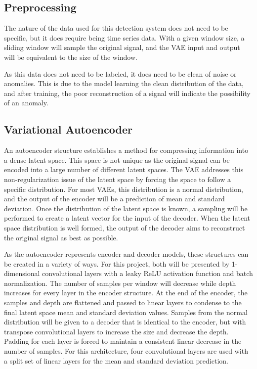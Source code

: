 \documentclass[conference]{IEEEtran}
\begin{document}
\subsection{Preprocessing}
The nature of the data used for this detection system does not need to be specific, but it does require being time series data. With a given window size, a sliding window will sample the original signal, and the VAE input and output will be equivalent to the size of the window. 

As this data does not need to be labeled, it does need to be clean of noise or anomalies. This is due to the model learning the clean distribution of the data, and after training, the poor reconstruction of a signal will indicate the possibility of an anomaly.


\subsection{Variational Autoencoder}
An autoencoder structure establishes a method for compressing information into a dense latent space. This space is not unique as the original signal can be encoded into a large number of different latent spaces. The VAE addresses this non-regularization issue of the latent space by forcing the space to follow a specific distribution\cite{vae_page}. For most VAEs, this distribution is a normal distribution, and the output of the encoder will be a prediction of mean and standard deviation. Once the distribution of the latent space is known, a sampling will be performed to create a latent vector for the input of the decoder. When the latent space distribution is well formed, the output of the decoder aims to reconstruct the original signal as best as possible.

As the autoencoder represents encoder and decoder models, these structures can be created in a variety of ways. For this project, both will be presented by 1-dimensional convolutional layers with a leaky ReLU activation function and batch normalization. The number of samples per window will decrease while depth increases for every layer in the encoder structure. At the end of the encoder, the samples and depth are flattened and passed to linear layers to condense to the final latent space mean and standard deviation values. Samples from the normal distribution will be given to a decoder that is identical to the encoder, but with transpose convolutional layers to increase the size and decrease the depth. Padding for each layer is forced to maintain a consistent  linear decrease in the number of samples. For this architecture, four convolutional layers are used with a split set of linear layers for the mean and standard deviation prediction.
\end{document}
